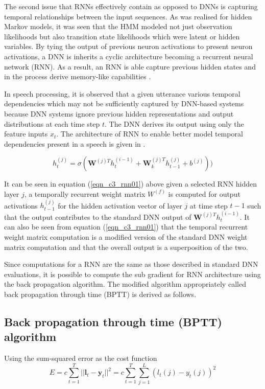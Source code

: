 The second issue that RNNs effectively contain as opposed to DNNs is capturing temporal relationships between the input sequences.  As was realised for hidden Markov models, it was seen that the HMM modeled not just observation likelihoods but also transition state likelihoods which were latent or hidden variables.  By tying the output of previous neuron activations to present neuron activations, a DNN is inherits a cyclic architecture becoming a recurrent neural network (RNN). As a result, an RNN is able capture previous hidden states and in the process derive memory-like capabilities \citep{yu2016automatic}.

In speech processing, it is observed that a given utterance various temporal dependencies which may not be sufficiently captured by DNN-based systems because DNN systems ignore previous hidden representations and output distributions at each time step $t$.  The DNN derives its output using only the  feature inputs $x_t$. The architecture of RNN to enable better model temporal dependencies present in a speech is given in \citep{hannun2014first, yu2016automatic}. 

\begin{equation}h_t^{(j)}=\sigma(\mathbf{W}^{(j)T}h_t^{(i-1)}+\mathbf{W}^{(j)T}_kh_{t-1}^{(j)}+b^{(j)}))
\label{eqn_c3_rnn01}\end{equation}

It can be seen in equation (\ref{eqn_c3_rnn01}) above given a selected RNN  hidden layer $j$, a temporally recurrent weight matrix $W^{(f)}$ is computed for output activations $h^{(j)}_{t-1}$ for the hidden activation vector of layer $j$ at time step $t - 1$ such that the output contributes to the standard DNN output of  $\mathbf{W}^{(j)T}h_t^{(i-1)}$. It can also be seen from  equation (\ref{eqn_c3_rnn01}) that the temporal recurrent weight matrix computation is a modified version of the standard DNN weight matrix computation and that the overall output is a superposition of the two.

Since computations for a RNN are the same as those described in standard DNN evaluations, it is possible to compute the sub gradient for  RNN architecture using the back propagation algorithm.  The modified algorithm appropriately called back propagation through time (BPTT) \citep{boden2002guide,jaeger2002tutorial} is derived as follows.  
\subsection{Back propagation through time (BPTT) algorithm}
Using the sum-squared error as the cost function
\begin{equation}
E=c\sum_{t=1}^T||\mathbf{l}_t-\mathbf{y}_t||^2=c\sum_{t=1}^T\sum_{j=1}^L(l_t(j)-y_t(j))^2 \label{eqn_c3_bptt01}\end{equation}

